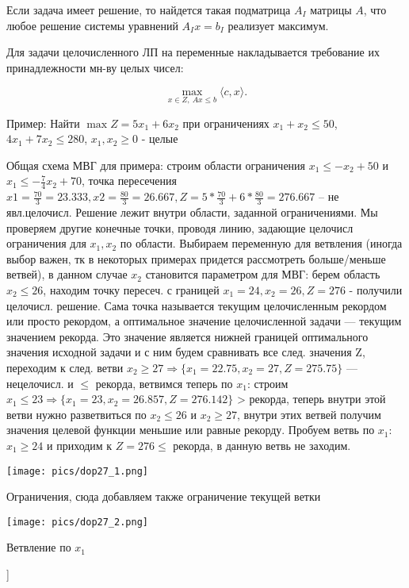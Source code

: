 Если задача имеет решение, то найдется такая подматрица $A_I$ матрицы $A$, что любое решение системы уравнений $A_Ix = b_I$ реализует максимум.

Для задачи целочисленного ЛП на переменные накладывается требование их принадлежности мн-ву целых чисел:

$$\max_{x \in Z,~Ax \leqslant b} \langle c, x \rangle.$$

Пример: Найти $\max Z = 5x_1 + 6x_2$ при ограничениях $x_1+x_2 \leq 50$, $4x_1+7x_2 \leq 280$, $x_1,x_2 \geq 0$ - целые

Общая схема МВГ для примера: строим области ограничения $x_1 \leq -x_2+50$ и $x_1 \leq - \frac{7}{4}x_2+70$,
точка пересечения $x1=\frac{70}{3}=23.333, x2=\frac{80}{3}=26.667, Z=5*\frac{70}{3}+6*\frac{80}{3}=276.667$ -- не явл.целочисл. 
Решение лежит внутри области, заданной ограничениями. 
Мы проверяем другие конечные точки, проводя линию, задающие целочисл ограничения для $x_1, x_2$ по области. 
Выбираем переменную для ветвления (иногда выбор важен, тк в некоторых примерах придется рассмотреть больше/меньше ветвей), 
в данном случае $x_2$ становится параметром для МВГ: берем область $x_2 \leq 26$, находим точку пересеч. 
с границей ${x_1=24, x_2=26, Z=276}$ - получили целочисл. решение. 
Сама точка называется текущим целочисленным рекордом или просто рекордом, а оптимальное значение целочисленной задачи — текущим значением рекорда. 
Это значение является нижней границей оптимального значения исходной задачи и с ним будем сравнивать все след. значения Z, 
переходим к след. ветви $x_2 \geq 27 \Rightarrow \{x_1=22.75, x_2=27, Z=275.75\}$ --- нецелочисл. и $\leq$ рекорда, ветвимся теперь по $x_1$: 
строим $x_1 \leq 23 \Rightarrow \{x_1=23, x_2=26.857, Z=276.142 \}$ > рекорда, теперь внутри этой ветви нужно разветвиться по $x_2 \leq 26$ и $x_2 \geq 27$, 
внутри этих ветвей получим значения целевой функции меньшие или равные рекорду. 
Пробуем ветвь по $x_1:$ $x_1 \geq 24$ и приходим к $Z=276 \leq$ рекорда, в данную ветвь не заходим.


\texttt{[image: pics/dop27\_1.png]}

Ограничения, сюда добавляем также ограничение текущей ветки


\texttt{[image: pics/dop27\_2.png]}

Ветвление по $x_1$

\bigbreak
[\cite[page 69-96]{replace_me}]